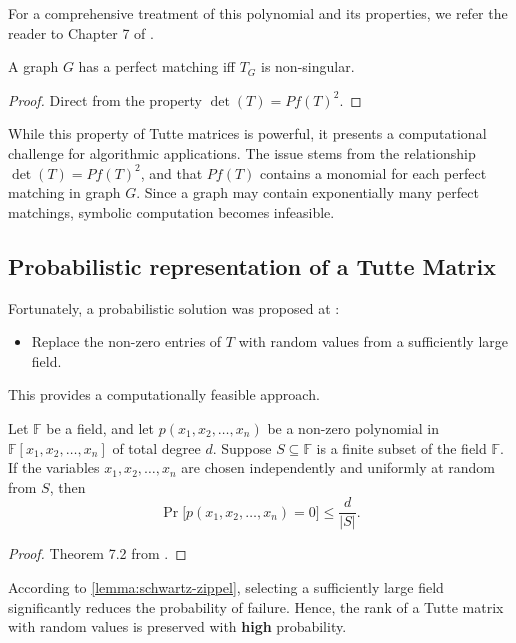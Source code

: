 For a comprehensive treatment of this polynomial and its properties, we refer the reader to Chapter 7 of \citet{Godsil:1993}.

\begin{fact}
    \label{fact:matching_condition}
    A graph \(G\) has a perfect matching iff \(T_G\) is non-singular.
\end{fact}

\begin{proof}
    Direct from the property \(\det(T) = Pf(T)^2\).
\end{proof}

While this property of Tutte matrices is powerful, it presents a computational challenge for algorithmic applications. 
The issue stems from the relationship \(\det(T) = Pf(T)^2\), and that \(Pf(T)\) contains a monomial for each perfect matching in graph \(G\).
Since a graph may contain exponentially many perfect matchings, symbolic computation becomes infeasible.

\subsection{Probabilistic representation of a Tutte Matrix}
\label{sec:prob_tutte}
\noindent
Fortunately, a probabilistic solution was proposed at \citet{Lovasz:Random}:
\begin{itemize}
    \item Replace the non-zero entries of \(T\) with random values from a sufficiently large field.
\end{itemize}
This provides a computationally feasible approach.

\begin{lemma}
\label{lemma:schwartz-zippel}
Let \(\mathbb{F}\) be a field, and let \(p(x_1, x_2, \dots, x_n)\) be a non-zero polynomial in \(\mathbb{F}[x_1, x_2, \dots, x_n]\) of total degree \(d\). 
Suppose \(S \subseteq \mathbb{F}\) is a finite subset of the field \( \mathbb{F} \). 
If the variables \(x_1, x_2, \dots, x_n\) are chosen independently and uniformly at random from \( S \), then
\[
\Pr\big[p(x_1, x_2, \dots, x_n) = 0\big] \leq \frac{d}{|S|}.
\]
\end{lemma}

\begin{proof}
    Theorem 7.2 from \citet{MotwaniRaghavan1995}.
\end{proof}

According to \cref{lemma:schwartz-zippel}, selecting a sufficiently large field significantly reduces the probability of failure.
Hence, the rank of a Tutte matrix with random values is preserved with \textbf{high} probability.

